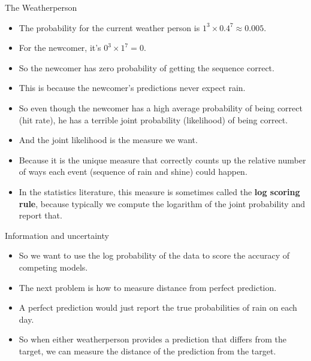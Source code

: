\documentclass[handout]{beamer}
\begin{document}
\begin{frame}{The Weatherperson}
\scriptsize{

\begin{itemize}
\item The probability for the current weather person is $1^3 \times 0.4^7 \approx 0.005$. 

\item For the newcomer, it's $0^3 \times 1^7 = 0$. 
\item So the newcomer has zero
probability of getting the sequence correct. 
\item This is because the newcomer's predictions never expect rain.
\item So even though the newcomer has a high average probability of being correct
(hit rate), he has a terrible joint probability (likelihood) of being correct.

\item And the joint likelihood is the measure we want. 

\item Because it is the unique measure that correctly counts up the relative number of ways each event (sequence of rain and shine) could happen.

\item In the statistics literature, this measure is sometimes called the
\textbf{log scoring rule}, because typically we compute the logarithm of the joint probability and report that.


\end{itemize}


} 
\end{frame}


\begin{frame}{Information and uncertainty}
\scriptsize{

\begin{itemize}
\item So we want to use the log probability of the data to
score the accuracy of competing models. 
\item The next problem is how to measure distance from
perfect prediction.
\item A perfect prediction would just report the true probabilities of rain on each day. 
\item So when either weatherperson provides a prediction that differs from the target, we can measure the distance of the prediction from the target.

\end{itemize}


} 
\end{frame}
\end{document}

